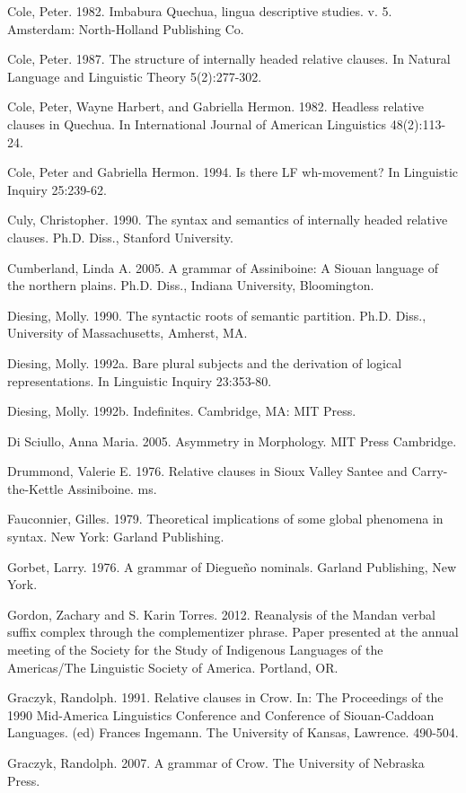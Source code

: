 \documentclass[output=paper]{LSP/langsci}
\begin{document}
\begin{reflist}
Cole, Peter. 1982. Imbabura Quechua, lingua descriptive studies. v. 5. Amsterdam: North-Holland Publishing Co.

Cole, Peter. 1987. The structure of internally headed relative clauses. In Natural Language and Linguistic Theory 5(2):277-302. 

Cole, Peter, Wayne Harbert, and Gabriella Hermon. 1982. Headless relative clauses in Quechua. In International Journal of American Linguistics 48(2):113-24.

Cole, Peter and Gabriella Hermon. 1994. Is there LF wh-movement? In Linguistic Inquiry 25:239-62.

Culy, Christopher. 1990. The syntax and semantics of internally headed relative clauses.  Ph.D. Diss., Stanford University.

Cumberland, Linda A. 2005. A grammar of Assiniboine: A Siouan language of the northern plains.  Ph.D. Diss., Indiana University, Bloomington.

Diesing, Molly. 1990. The syntactic roots of semantic partition. Ph.D. Diss., University of Massachusetts, Amherst, MA.

Diesing, Molly. 1992a. Bare plural subjects and the derivation of logical representations. In Linguistic Inquiry 23:353-80.

Diesing, Molly. 1992b. Indefinites. Cambridge, MA: MIT Press.

Di Sciullo, Anna Maria. 2005. Asymmetry in Morphology. MIT Press Cambridge.

Drummond, Valerie E. 1976. Relative clauses in Sioux Valley Santee and Carry-the-Kettle Assiniboine. ms.

Fauconnier, Gilles. 1979. Theoretical implications of some global phenomena in syntax. New York: Garland Publishing.

Gorbet, Larry. 1976. A grammar of Diegue\~no nominals. Garland Publishing, New York.

Gordon, Zachary and S. Karin Torres. 2012. Reanalysis of the Mandan verbal suffix complex through the complementizer phrase. Paper presented at the annual meeting of the Society for the Study of Indigenous Languages of the Americas/The Linguistic Society of America. Portland, OR.

Graczyk, Randolph. 1991. Relative clauses in Crow. In: The Proceedings of the 1990 Mid-America Linguistics Conference and Conference of Siouan-Caddoan Languages. (ed) Frances Ingemann. The University of Kansas, Lawrence. 490-504. 

Graczyk, Randolph. 2007. A grammar of Crow. The University of Nebraska Press.


\end{reflist}
\end{document}
